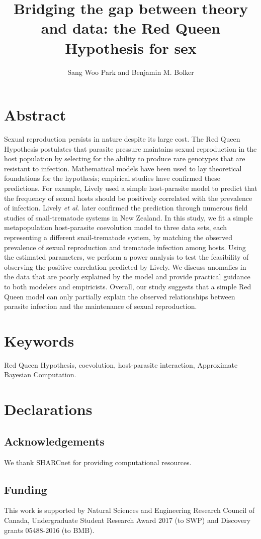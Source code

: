 \documentclass{article}\usepackage[]{graphicx}\usepackage[]{color}
\title{Bridging the gap between theory and data: the Red Queen Hypothesis for sex}
\author{Sang Woo Park and Benjamin M. Bolker}
\date{}
\begin{document}
\maketitle

\section*{Abstract}

Sexual reproduction persists in nature despite its large cost.
The Red Queen Hypothesis postulates that parasite pressure maintains sexual reproduction in the host population by selecting for the ability to produce rare genotypes that are resistant to infection.
Mathematical models have been used to lay theoretical foundations for the hypothesis; empirical studies have confirmed these predictions.
For example, Lively used a simple host-parasite model to predict that the frequency of sexual hosts should be positively correlated with the prevalence of infection. 
Lively \textit{et al.} later confirmed the prediction through numerous field studies of snail-trematode systems in New Zealand.
In this study, we fit a simple metapopulation host-parasite coevolution model to three data sets, each representing a different snail-trematode system, by matching the observed prevalence of sexual reproduction and trematode infection among hosts.
Using the estimated parameters, we perform a power analysis to test the feasibility of observing the positive correlation predicted by Lively.
We discuss anomalies in the data that are poorly explained by the model and provide practical guidance to both modelers and empiricists.
Overall, our study suggests that a simple Red Queen model can only partially explain the observed relationships between parasite infection and the maintenance of sexual reproduction.

\section*{Keywords}

Red Queen Hypothesis, coevolution, host-parasite interaction, Approximate Bayesian Computation.

\section*{Declarations}

\subsection*{Acknowledgements}

We thank SHARCnet for providing computational resources. 

\subsection*{Funding}

This work is supported by Natural Sciences and Engineering Research Council of Canada, Undergraduate Student Research Award 2017 (to SWP) and Discovery grants 05488-2016 (to BMB).
\end{document}
